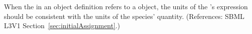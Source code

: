 When the  in an \InitialAssignment object definition refers
to a \Species object, the units of the \InitialAssignment's 
expression should be consistent with the units of the species' quantity.
(References: SBML L3V1 Section~\ref{sec:initialAssignment}.)
